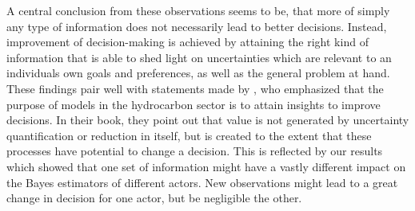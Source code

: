 	A central conclusion from these observations seems to be, that more of simply any type of information does not necessarily lead to better decisions. Instead, improvement of decision-making is achieved by attaining the right kind of information that is able to shed light on uncertainties which are relevant to an individuals own goals and preferences, as well as the general problem at hand. These findings pair well with statements made by \citet{bratvold2010making}, who emphasized that the purpose of models in the hydrocarbon sector is to attain insights to improve decisions. In their book, they point out that value is not generated by uncertainty quantification or reduction in itself, but is created to the extent that these processes have potential to change a decision. This is reflected by our results which showed that one set of information might have a vastly different impact on the Bayes estimators of different actors. New observations might lead to a great change in decision for one actor, but be negligible the other.	
